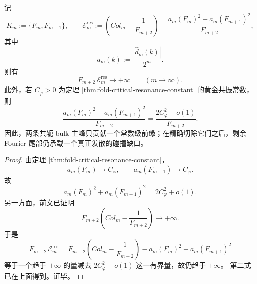 \begin{proposition}\label{prop:conclusion-foldbin-remove-main-resonance-peaks-still-diverges}
记
\[
K_m:=\{F_m,F_{m+1}\},
\qquad
\mathcal E_m^{\mathrm{res}}
:=
\left(Col_m-\frac1{F_{m+2}}\right)
-
\frac{a_m(F_m)^2+a_m(F_{m+1})^2}{F_{m+2}},
\]
其中
\[
a_m(k):=\frac{|\widehat d_m(k)|}{2^m}.
\]
则有
\[
F_{m+2}\,\mathcal E_m^{\mathrm{res}}\longrightarrow +\infty
\qquad (m\to\infty).
\]
此外，若 \(C_\varphi>0\) 为定理 \ref{thm:fold-critical-resonance-constant} 的黄金共振常数，则
\[
\frac{a_m(F_m)^2+a_m(F_{m+1})^2}{F_{m+2}}
=
\frac{2C_\varphi^2+o(1)}{F_{m+2}}.
\]
因此，两条共轭 bulk 主峰只贡献一个常数级前缘；在精确切除它们之后，剩余 Fourier 尾部仍承载一个真正发散的碰撞缺口。
\end{proposition}
\begin{proof}
由定理 \ref{thm:fold-critical-resonance-constant}，
\[
a_m(F_m)\to C_\varphi,
\qquad
a_m(F_{m+1})\to C_\varphi.
\]
故
\[
a_m(F_m)^2+a_m(F_{m+1})^2=2C_\varphi^2+o(1).
\]
另一方面，前文已证明
\[
F_{m+2}\left(Col_m-\frac1{F_{m+2}}\right)\to+\infty.
\]
于是
\[
F_{m+2}\,\mathcal E_m^{\mathrm{res}}
=
F_{m+2}\left(Col_m-\frac1{F_{m+2}}\right)
-
a_m(F_m)^2-a_m(F_{m+1})^2
\]
等于一个趋于 \(+\infty\) 的量减去 \(2C_\varphi^2+o(1)\) 这一有界量，故仍趋于 \(+\infty\)。
第二式已在上面得到。证毕。
\end{proof}

